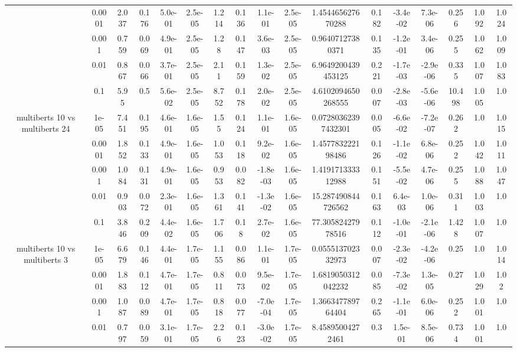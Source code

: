 \begin{tabular}{|c|c|c|c|c|c|c|c|c|c|c|c|c|c|c|c|c|}
 & 0.0001 & 2.037 & 0.176 & 5.0e-01 & 2.5e-05 & 1.214 & 0.136 & 1.1e-01 & 2.5e-05 & 1.454465627670288 & 0.182 & -3.4e-02 & 7.3e-06 & 0.256 & 1.092 & 1.024 \\
 & 0.001 & 0.759 & 0.069 & 4.9e-01 & 2.5e-05 & 1.28 & 0.147 & 3.6e-03 & 2.5e-05 & 0.96407127380371 & 0.135 & -1.2e-01 & 3.4e-06 & 0.255 & 1.062 & 1.009 \\
 & 0.01 & 0.867 & 0.066 & 3.7e-01 & 2.5e-05 & 2.11 & 0.159 & 1.3e-02 & 2.5e-05 & 6.9649200439453125 & 0.221 & -1.7e-03 & -2.9e-06 & 0.335 & 1.007 & 1.083 \\
 & 0.1 & 5.95 & 0.5 & 5.6e-02 & 2.5e-05 & 8.752 & 0.178 & 2.0e-02 & 2.5e-05 & 4.6102094650268555 & 0.007 & -2.8e-03 & -5.6e-06 & 10.498 & 1.005 & 1.0 \\
\hline
\multirow{5}{*}{multiberts 10 vs multiberts 24} & 1e-05 & 7.451 & 0.195 & 4.6e-01 & 1.6e-05 & 1.55 & 0.124 & 1.1e-01 & 1.6e-05 & 0.07280362397432301 & 0.005 & -6.6e-02 & -7.2e-07 & 0.262 & 1.0 & 1.015 \\
 & 0.0001 & 1.852 & 0.133 & 4.9e-01 & 1.6e-05 & 1.053 & 0.118 & 9.2e-02 & 1.6e-05 & 1.457783222198486 & 0.126 & -1.1e-02 & 6.8e-06 & 0.252 & 1.042 & 1.011 \\
 & 0.001 & 1.084 & 0.131 & 4.9e-01 & 1.6e-05 & 0.953 & 0.082 & -1.8e-03 & 1.6e-05 & 1.419171333312988 & 0.151 & -5.5e-02 & 4.7e-06 & 0.255 & 1.088 & 1.047 \\
 & 0.01 & 0.903 & 0.072 & 2.3e-01 & 1.6e-05 & 1.361 & 0.141 & -1.3e-02 & 1.6e-05 & 15.287490844726562 & 0.163 & 6.4e-03 & 1.0e-06 & 0.311 & 1.003 & 1.0 \\
 & 0.1 & 3.846 & 0.209 & 4.4e-02 & 1.6e-05 & 1.706 & 0.18 & 2.7e-02 & 1.6e-05 & 77.30582427978516 & 0.112 & -1.0e-01 & -2.1e-06 & 1.428 & 1.007 & 1.0 \\
\hline
\multirow{5}{*}{multiberts 10 vs multiberts 3} & 1e-05 & 6.679 & 0.146 & 4.4e-01 & 1.7e-05 & 1.155 & 0.086 & 1.1e-01 & 1.7e-05 & 0.055513702332973 & 0.007 & -2.3e-02 & -4.2e-06 & 0.25 & 1.0 & 1.014 \\
 & 0.0001 & 1.883 & 0.112 & 4.7e-01 & 1.7e-05 & 0.811 & 0.073 & 9.5e-02 & 1.7e-05 & 1.6819050312042232 & 0.085 & -7.3e-02 & 1.3e-05 & 0.27 & 1.029 & 1.02 \\
 & 0.001 & 1.087 & 0.089 & 4.7e-01 & 1.7e-05 & 0.818 & 0.077 & -7.0e-04 & 1.7e-05 & 1.366347789764404 & 0.265 & -1.1e-01 & 6.0e-06 & 0.252 & 1.001 & 1.0 \\
 & 0.01 & 0.797 & 0.059 & 3.1e-01 & 1.7e-05 & 2.26 & 0.123 & -3.0e-02 & 1.7e-05 & 8.45895004272461 & 0.3 & 1.5e-01 & 8.5e-06 & 0.734 & 1.001 & 1.0 \\

\end{tabular}
